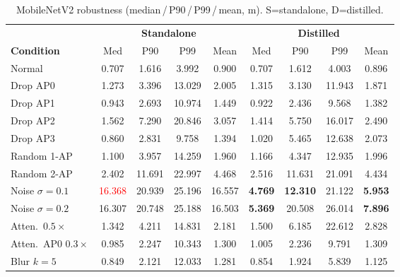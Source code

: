\documentclass[11pt,a4paper]{article}
\newcommand{\best}[1]{\textcolor{ours}{\textbf{#1}}}
\begin{document}
\begin{table}[H]
\centering
\caption{MobileNetV2 robustness (median\,/\,P90\,/\,P99\,/\,mean, m). S=standalone, D=distilled.}
\small
\begin{tabular}{@{}lcccc|cccc@{}}
\toprule
 & \multicolumn{4}{c|}{\textbf{Standalone}} & \multicolumn{4}{c}{\textbf{Distilled}} \\
\textbf{Condition} & Med & P90 & P99 & Mean & Med & P90 & P99 & Mean \\
\midrule
Normal              & 0.707 & 1.616 & 3.992 & 0.900 & 0.707 & 1.612 & 4.003 & 0.896 \\
Drop AP0            & 1.273 & 3.396 & 13.029& 2.005 & 1.315 & 3.130 & 11.943& 1.871 \\
Drop AP1            & 0.943 & 2.693 & 10.974& 1.449 & 0.922 & 2.436 & 9.568 & 1.382 \\
Drop AP2            & 1.562 & 7.290 & 20.846& 3.057 & 1.414 & 5.750 & 16.017& 2.490 \\
Drop AP3            & 0.860 & 2.831 & 9.758 & 1.394 & 1.020 & 5.465 & 12.638& 2.073 \\
Random 1-AP         & 1.100 & 3.957 & 14.259& 1.960 & 1.166 & 4.347 & 12.935& 1.996 \\
Random 2-AP         & 2.402 & 11.691& 22.997& 4.468 & 2.516 & 11.631& 21.091& 4.434 \\
Noise $\sigma{=}0.1$& \textcolor{red}{16.368}& 20.939& 25.196& 16.557& \best{4.769}& \best{12.310}& 21.122& \best{5.953} \\
Noise $\sigma{=}0.2$& 16.307& 20.748& 25.188& 16.503& \best{5.369}& 20.508& 26.014& \best{7.896} \\
Atten.\ $0.5\times$ & 1.342 & 4.211 & 14.831& 2.181 & 1.500 & 6.185 & 22.612& 2.828 \\
Atten.\ AP0 $0.3\times$& 0.985& 2.247& 10.343& 1.300 & 1.005 & 2.236 & 9.791 & 1.309 \\
Blur $k{=}5$        & 0.849 & 2.121 & 12.033& 1.281 & 0.854 & 1.924 & 5.839 & 1.125 \\
\bottomrule
\end{tabular}
\end{table}
\end{document}
